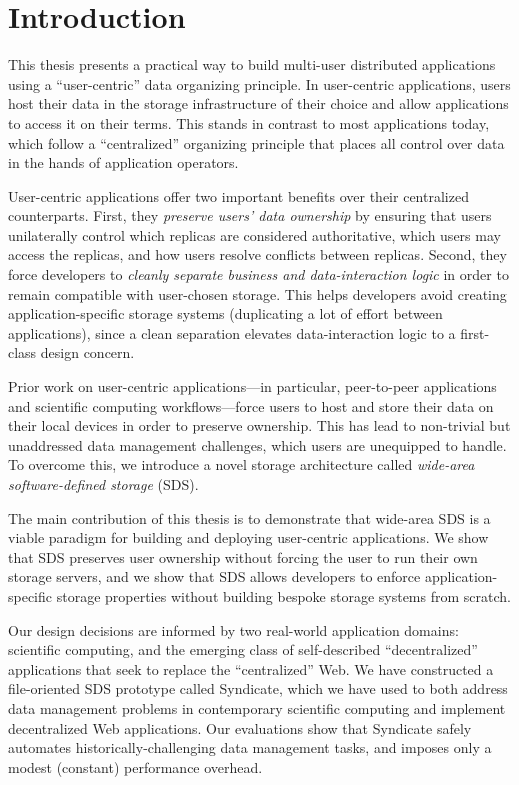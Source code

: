 \chapter{Introduction}
\label{chap:introduction}

This thesis presents a practical way to build multi-user distributed
applications using a ``user-centric'' data organizing principle.
In user-centric applications, users host their
data in the storage infrastructure of their choice and allow
applications to access it on their terms.  This stands in contrast to most
applications today, which follow a ``centralized'' organizing principle
that places all control over data in the hands of application operators.

User-centric applications offer two important benefits over their centralized
counterparts.  First, they \emph{preserve users' data ownership}
by ensuring that users unilaterally control which
replicas are considered authoritative, which users may access the replicas, and
how users resolve conflicts between replicas.  Second, they force
developers to \emph{cleanly separate business and data-interaction logic}
in order to remain compatible with user-chosen storage.  This helps developers
avoid creating application-specific storage systems (duplicating a lot of effort
between applications), since a clean separation
elevates data-interaction logic to a first-class design concern.

Prior work on user-centric applications---in particular, peer-to-peer
applications and scientific computing workflows---force users to host
and store their data on their local devices
in order to preserve ownership.  This has lead to non-trivial but unaddressed
data management challenges, which users are unequipped to handle.
To overcome this, we introduce a novel storage
architecture called \emph{wide-area software-defined storage} (SDS).

The main contribution of this thesis is to demonstrate that wide-area SDS 
is a viable paradigm for building and deploying user-centric applications.  We
show that SDS preserves user ownership without forcing the user to run their own
storage servers, and we show that SDS allows developers to enforce
application-specific storage properties without building bespoke storage systems
from scratch.

Our design decisions are informed by two real-world application domains:
scientific computing, and the emerging class of self-described ``decentralized'' applications
that seek to replace the ``centralized'' Web.  We have constructed a
file-oriented SDS prototype called Syndicate, which we have used to both address
data management problems in contemporary scientific computing and implement
decentralized Web applications.  Our evaluations show that Syndicate safely automates
historically-challenging data management tasks, and imposes only a modest
(constant) performance overhead.


